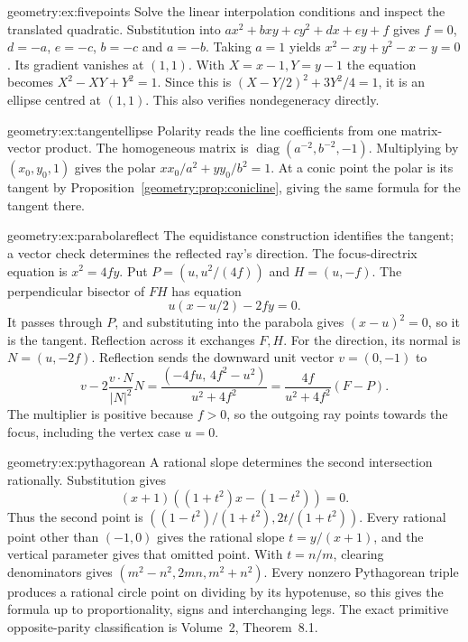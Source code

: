 \begin{solution}{geometry:ex:fivepoints}
\idea Solve the linear interpolation conditions and inspect the translated quadratic.
\writeup Substitution into $ax^2+bxy+cy^2+dx+ey+f$ gives $f=0$, $d=-a$, $e=-c$, $b=-c$ and $a=-b$. Taking $a=1$ yields $x^2-xy+y^2-x-y=0$. Its gradient vanishes at $(1,1)$. With $X=x-1,Y=y-1$ the equation becomes $X^2-XY+Y^2=1$. Since this is $(X-Y/2)^2+3Y^2/4=1$, it is an ellipse centred at $(1,1)$. This also verifies nondegeneracy directly.
\end{solution}
\begin{solution}{geometry:ex:tangentellipse}
\idea Polarity reads the line coefficients from one matrix-vector product.
\writeup The homogeneous matrix is $\operatorname{diag}(a^{-2},b^{-2},-1)$. Multiplying by $(x_0,y_0,1)$ gives the polar $xx_0/a^2+yy_0/b^2=1$. At a conic point the polar is its tangent by Proposition~\ref{geometry:prop:conicline}, giving the same formula for the tangent there.
\end{solution}
\begin{solution}{geometry:ex:parabolareflect}
\idea The equidistance construction identifies the tangent; a vector check determines the reflected ray's direction.
\writeup The focus-directrix equation is $x^2=4fy$. Put $P=(u,u^2/(4f))$ and $H=(u,-f)$. The perpendicular bisector of $FH$ has equation
\[
u(x-u/2)-2fy=0.
\]
It passes through $P$, and substituting into the parabola gives $(x-u)^2=0$, so it is the tangent. Reflection across it exchanges $F,H$. For the direction, its normal is $N=(u,-2f)$. Reflection sends the downward unit vector $v=(0,-1)$ to
\[
v-2\frac{v\cdot N}{|N|^2}N
=\frac{(-4fu,\,4f^2-u^2)}{u^2+4f^2}
=\frac{4f}{u^2+4f^2}(F-P).
\]
The multiplier is positive because $f>0$, so the outgoing ray points towards the focus, including the vertex case $u=0$.
\end{solution}
\begin{solution}{geometry:ex:pythagorean}
\idea A rational slope determines the second intersection rationally.
\writeup Substitution gives
\[
(x+1)((1+t^2)x-(1-t^2))=0.
\]
Thus the second point is $((1-t^2)/(1+t^2),2t/(1+t^2))$. Every rational point other than $(-1,0)$ gives the rational slope $t=y/(x+1)$, and the vertical parameter gives that omitted point. With $t=n/m$, clearing denominators gives $(m^2-n^2,2mn,m^2+n^2)$. Every nonzero Pythagorean triple produces a rational circle point on dividing by its hypotenuse, so this gives the formula up to proportionality, signs and interchanging legs. The exact primitive opposite-parity classification is Volume~2, Theorem~8.1.
\end{solution}
